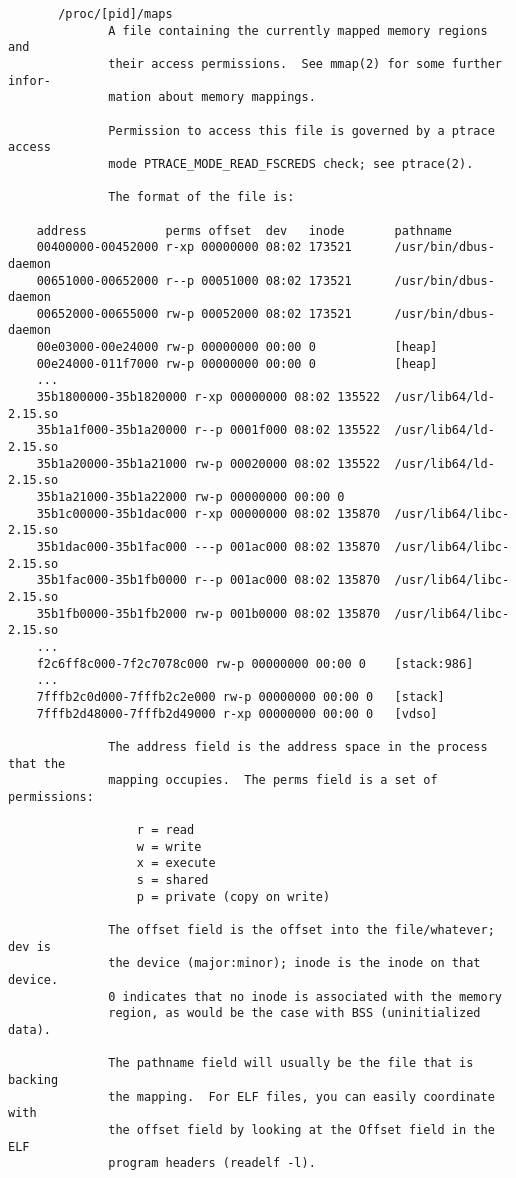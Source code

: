 \documentclass[]{article}
\begin{document}
\begin{verbatim}
       /proc/[pid]/maps
              A file containing the currently mapped memory regions and
              their access permissions.  See mmap(2) for some further infor‐
              mation about memory mappings.

              Permission to access this file is governed by a ptrace access
              mode PTRACE_MODE_READ_FSCREDS check; see ptrace(2).

              The format of the file is:

    address           perms offset  dev   inode       pathname
    00400000-00452000 r-xp 00000000 08:02 173521      /usr/bin/dbus-daemon
    00651000-00652000 r--p 00051000 08:02 173521      /usr/bin/dbus-daemon
    00652000-00655000 rw-p 00052000 08:02 173521      /usr/bin/dbus-daemon
    00e03000-00e24000 rw-p 00000000 00:00 0           [heap]
    00e24000-011f7000 rw-p 00000000 00:00 0           [heap]
    ...
    35b1800000-35b1820000 r-xp 00000000 08:02 135522  /usr/lib64/ld-2.15.so
    35b1a1f000-35b1a20000 r--p 0001f000 08:02 135522  /usr/lib64/ld-2.15.so
    35b1a20000-35b1a21000 rw-p 00020000 08:02 135522  /usr/lib64/ld-2.15.so
    35b1a21000-35b1a22000 rw-p 00000000 00:00 0
    35b1c00000-35b1dac000 r-xp 00000000 08:02 135870  /usr/lib64/libc-2.15.so
    35b1dac000-35b1fac000 ---p 001ac000 08:02 135870  /usr/lib64/libc-2.15.so
    35b1fac000-35b1fb0000 r--p 001ac000 08:02 135870  /usr/lib64/libc-2.15.so
    35b1fb0000-35b1fb2000 rw-p 001b0000 08:02 135870  /usr/lib64/libc-2.15.so
    ...
    f2c6ff8c000-7f2c7078c000 rw-p 00000000 00:00 0    [stack:986]
    ...
    7fffb2c0d000-7fffb2c2e000 rw-p 00000000 00:00 0   [stack]
    7fffb2d48000-7fffb2d49000 r-xp 00000000 00:00 0   [vdso]

              The address field is the address space in the process that the
              mapping occupies.  The perms field is a set of permissions:

                  r = read
                  w = write
                  x = execute
                  s = shared
                  p = private (copy on write)

              The offset field is the offset into the file/whatever; dev is
              the device (major:minor); inode is the inode on that device.
              0 indicates that no inode is associated with the memory
              region, as would be the case with BSS (uninitialized data).

              The pathname field will usually be the file that is backing
              the mapping.  For ELF files, you can easily coordinate with
              the offset field by looking at the Offset field in the ELF
              program headers (readelf -l).


\end{verbatim}
\end{document}
